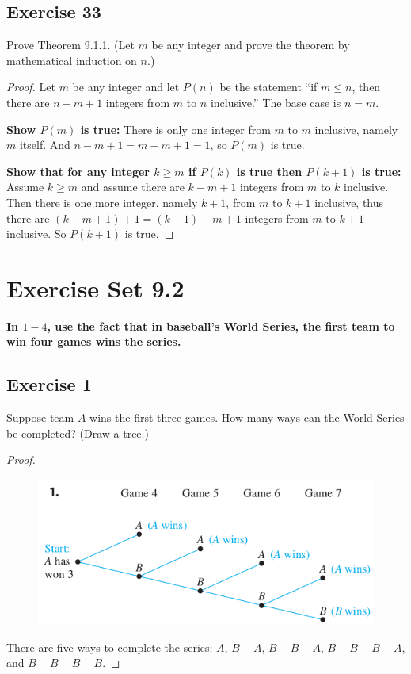 \documentclass[14pt]{extarticle}
\newcommand{\cy}{\color{cyan}}
\begin{document}
\subsection{Exercise 33}
Prove Theorem 9.1.1. (Let $m$ be any integer and prove the theorem by mathematical induction on $n$.)

\begin{proof}
Let $m$ be any integer and let \(P(n)\) be the statement ``if \(m \leq n\), then there are \(n - m + 1\) integers 
from $m$ to $n$ inclusive.'' The base case is \(n=m\).

{\bf Show $P(m)$ is true:} There is only one integer from $m$ to $m$ inclusive, namely $m$ itself. And \(n - m + 1
 = m - m + 1 = 1\), so $P(m)$ is true.

{\bf Show that for any integer \(k \geq m\) if \(P(k)\) is true then \(P(k+1)\) is true:} Assume \(k \geq m\) and
assume there are \(k-m+1\) integers from $m$ to $k$ inclusive. Then there is one more integer, namely \(k+1\),
from $m$ to $k+1$ inclusive, thus there are \((k-m+1)+1 = (k+1)-m+1\) integers from $m$ to $k+1$ inclusive. So 
\(P(k+1)\) is true.
\end{proof}

\section{Exercise Set 9.2}
{\bf \cy In $1-4$, use the fact that in baseball’s World Series, the first team to win four games wins the series.}

\subsection{Exercise 1}
Suppose team $A$ wins the first three games. How many ways can the World Series be completed? (Draw a tree.)

\begin{proof}
\begin{figure}[ht!]
\centering
\includegraphics[scale=0.6]{../images/9.2.1.png}
\end{figure}

There are five ways to complete the series: $A$, \(B-A\), \(B-B-A\), \(B-B-B-A\), and \(B-B-B-B\).
\end{proof}
\end{document}
